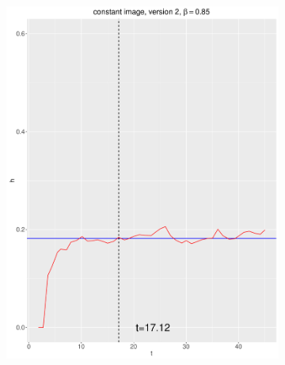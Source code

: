 \documentclass[12pt, oneside]{article}   	%
\begin{document}
\begin{figure}[H]
\begin{subfigure}[b]{0.475\textwidth}
            \includegraphics[width=\textwidth, height=0.32\textheight]{const_v2_85.pdf}
        \end{subfigure}
        \quad
        \begin{subfigure}[b]{0.475\textwidth}
            \centering

\end{subfigure}
\end{figure}
\end{document}

